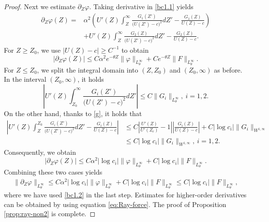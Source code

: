 \documentclass[reqno,11pt]{amsart}
\numberwithin{equation}{section}
\numberwithin{equation}{section}
\theoremstyle{plain}
\begin{document}
\begin{proof}
	Next we estimate $\partial_Z\varphi$. Taking derivative in \eqref{bc1.1} yields
	\begin{align}
		\partial_Z\varphi(Z)=&
		\alpha^2\left(U'(Z)\int_Z^\infty \frac{G_1(Z')}{\big(U(Z')-c\big)^2} dZ'-\frac{G_1(Z)}{U(Z)-c}\right)\nonumber\\
		&+U'(Z)\int_{Z}^\infty \frac{G_2(Z)}{\big(U(Z')-c\big)^2}dZ'-\frac{G_2(Z)}{U(Z)-c}.\nonumber
	\end{align}
	For $Z\geq Z_0$, we use $|U(Z)-c|\geq C^{-1}$ to obtain
	$$|\partial_Z\varphi(Z)|\leq C\alpha^2e^{-\theta Z}\|\varphi\|_{L^\infty_{\theta}}+Ce^{-\theta Z}\|F\|_{L^\infty_{\theta}}.
	$$ 
	For $Z\leq Z_0$, we split the integral domain into $(Z,Z_0)$ and $(Z_0,\infty)$ as before. In the interval $(Z_0,\infty)$, it holds 
	$$\left|U'(Z)\int_{Z_0}^\infty \frac{G_i(Z')}{\big(U(Z')-c\big)^2} dZ'\right|\leq C\|G_i\|_{L^\infty_{\theta}},~i=1,2.
	$$
On the other hand, thanks to \eqref{g}, it holds that
	$$\begin{aligned}
		\left| U'(Z) \int_{Z}^{Z_0} \frac{G_i(Z')}{\big(U(Z')-c\big)^2} dZ' -\frac{G_i(Z)}{U(Z)-c}\right|&\leq C\left|\frac{U'(Z)}{U'(Z_c)}-1\right|\left|\frac{G_i(Z)}{U(Z)-c}\right|+C|\log c_i|\|G_i\|_{W^{1,\infty}}\\
		&\leq C|\log c_i|\|G_i\|_{W^{1,\infty}},~i=1,2.
	\end{aligned}
	$$
Consequently, we obtain
	$$|\partial_Z\varphi(Z)|\leq C\alpha^2|\log c_i|\|\varphi\|_{L^\infty_{\theta}}+C|\log c_i|\|F\|_{L^\infty_{\theta}}.
	$$
	Combining these two cases yields
	\begin{align}
		\|\partial_Z\varphi\|_{L^\infty_\theta}\leq C\alpha^2|\log c_i|\|\varphi\|_{L^\infty_{\theta}}+C|\log c_i|\|F\|_{L^\infty_{\theta}}\leq C|\log c_i|\|F\|_{L^\infty_{\theta}},\nonumber
	\end{align}
where we have used \eqref{bc1.2} in the last step. Estimates for higher-order derivatives can be obtained by using equation \eqref{eq:Ray-force}. The proof of Proposition \ref{prop:ray-non2} is complete.
\end{proof}
\end{document}
